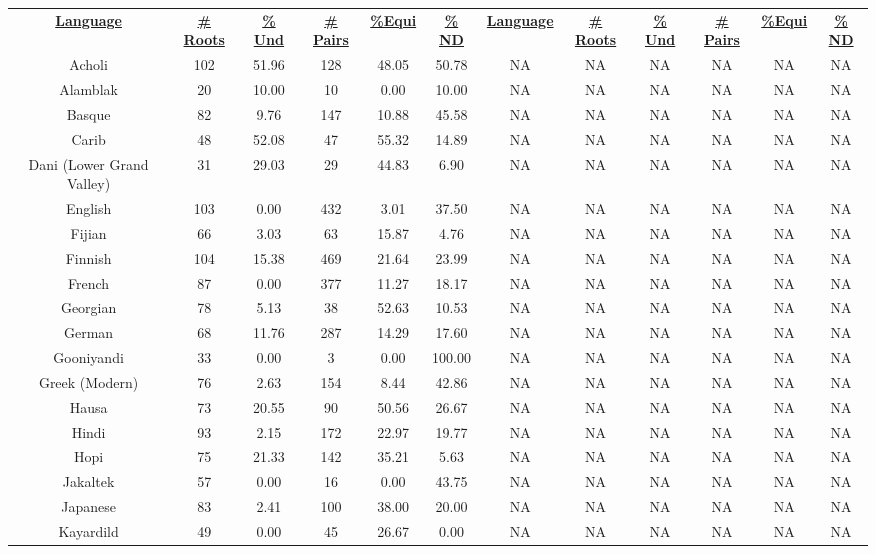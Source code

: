 \begin{tabular}{cccccccccccc}
\underline{\textbf{Language}} & \underline{\textbf{\# Roots}} & \underline{\textbf{\% Und}} & \underline{\textbf{\# Pairs}} & \underline{\textbf{\%Equi}} & \underline{\textbf{\% ND}} & \underline{\textbf{Language}} & \underline{\textbf{\# Roots}} & \underline{\textbf{\% Und}} & \underline{\textbf{\# Pairs}} & \underline{\textbf{\%Equi}} & \underline{\textbf{\% ND}} \\
Acholi & 102 & 51.96 & 128 & 48.05 & 50.78 & NA & NA & NA & NA & NA & NA \\
Alamblak & 20 & 10.00 & 10 & 0.00 & 10.00 & NA & NA & NA & NA & NA & NA \\
Basque & 82 & 9.76 & 147 & 10.88 & 45.58 & NA & NA & NA & NA & NA & NA \\
Carib & 48 & 52.08 & 47 & 55.32 & 14.89 & NA & NA & NA & NA & NA & NA \\
Dani (Lower Grand Valley) & 31 & 29.03 & 29 & 44.83 & 6.90 & NA & NA & NA & NA & NA & NA \\
English & 103 & 0.00 & 432 & 3.01 & 37.50 & NA & NA & NA & NA & NA & NA \\
Fijian & 66 & 3.03 & 63 & 15.87 & 4.76 & NA & NA & NA & NA & NA & NA \\
Finnish & 104 & 15.38 & 469 & 21.64 & 23.99 & NA & NA & NA & NA & NA & NA \\
French & 87 & 0.00 & 377 & 11.27 & 18.17 & NA & NA & NA & NA & NA & NA \\
Georgian & 78 & 5.13 & 38 & 52.63 & 10.53 & NA & NA & NA & NA & NA & NA \\
German & 68 & 11.76 & 287 & 14.29 & 17.60 & NA & NA & NA & NA & NA & NA \\
Gooniyandi & 33 & 0.00 & 3 & 0.00 & 100.00 & NA & NA & NA & NA & NA & NA \\
Greek (Modern) & 76 & 2.63 & 154 & 8.44 & 42.86 & NA & NA & NA & NA & NA & NA \\
Hausa & 73 & 20.55 & 90 & 50.56 & 26.67 & NA & NA & NA & NA & NA & NA \\
Hindi & 93 & 2.15 & 172 & 22.97 & 19.77 & NA & NA & NA & NA & NA & NA \\
Hopi & 75 & 21.33 & 142 & 35.21 & 5.63 & NA & NA & NA & NA & NA & NA \\
Jakaltek & 57 & 0.00 & 16 & 0.00 & 43.75 & NA & NA & NA & NA & NA & NA \\
Japanese & 83 & 2.41 & 100 & 38.00 & 20.00 & NA & NA & NA & NA & NA & NA \\
Kayardild & 49 & 0.00 & 45 & 26.67 & 0.00 & NA & NA & NA & NA & NA & NA \\

\end{tabular}
